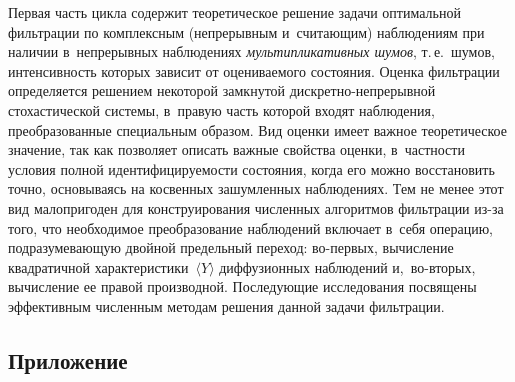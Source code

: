 \begin{multicols}{2}
 Первая часть цикла содержит теоретическое решение задачи оптимальной фильтрации по
  комплексным (непрерывным и~считающим) наблюдениям при наличии в~непрерывных наблюдениях
  \textit{мультипликативных шумов}, т.\,е.\ шумов, интенсивность которых зависит от 
  оцениваемого состояния.
       Оценка фильтрации определяется решением некоторой замкнутой 
  дис\-крет\-но-не\-пре\-рыв\-ной стохастической  системы, в~правую часть которой входят
   наблюдения, преобразованные специальным образом. Вид оценки имеет важное теоретическое 
   значение, так как позволяет описать важные свойства оценки, в~частности условия полной 
   идентифицируемости состояния, когда его можно восстановить точно, основываясь на косвенных 
   зашумленных наблюдениях. Тем не менее этот вид  малопригоден для конструирования чис\-лен\-ных 
   алгоритмов фильтрации из-за того, что необходимое преобразование наблюдений включает в~себя 
   операцию, подразумевающую двойной предельный переход: во-пер\-вых, вычисление квадратичной
    характеристики~$\langle Y \rangle$ диффузионных наблюдений и,~во-вто\-рых, 
    вы\-чис\-ле\-ние ее правой производной. Последующие исследования посвящены эффективным численным 
    методам решения данной задачи фильтрации.
    
{\small \subsection*{\raggedleft Приложение}

 


}
\end{multicols}

